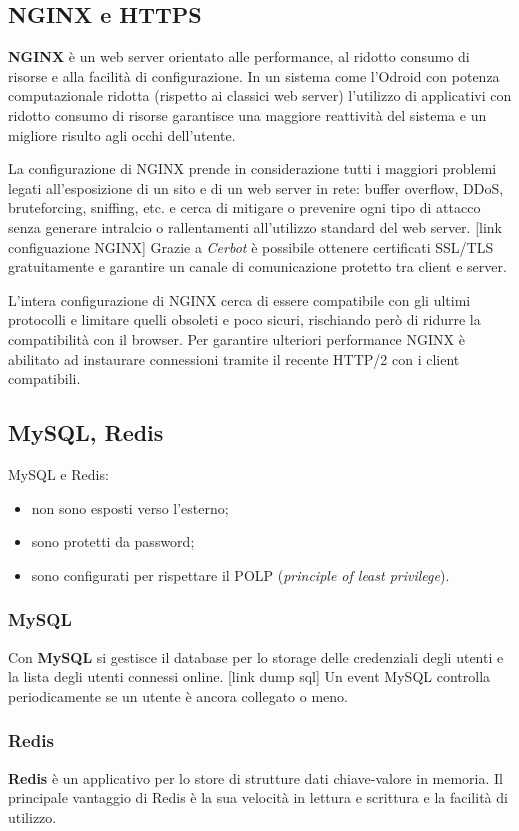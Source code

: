 \subsection{NGINX e HTTPS}
\textbf{NGINX} è un web server orientato alle performance, al ridotto consumo di risorse e alla facilità di configurazione.
In un sistema come l'Odroid con potenza computazionale ridotta (rispetto ai classici web server) l'utilizzo di applicativi con ridotto consumo di risorse garantisce una maggiore reattività del sistema e un migliore risulto agli occhi dell'utente.

La configurazione di NGINX prende in considerazione tutti i maggiori problemi legati all'esposizione di un sito e di un web server in rete: buffer overflow, DDoS, bruteforcing, sniffing, etc. e cerca di mitigare o prevenire ogni tipo di attacco senza generare intralcio o rallentamenti all'utilizzo standard del web server.
[link configuazione NGINX]
Grazie a \textit{Cerbot} è possibile ottenere certificati SSL/TLS gratuitamente e garantire un canale di comunicazione protetto tra client e server.

L'intera configurazione di NGINX cerca di essere compatibile con gli ultimi protocolli e limitare quelli obsoleti e poco sicuri, rischiando però di ridurre la compatibilità con il browser. Per garantire ulteriori performance NGINX è abilitato ad instaurare connessioni tramite il recente HTTP/2 con i client compatibili.

\subsection{MySQL, Redis}
MySQL e Redis:
\begin{itemize}
	\item non sono esposti verso l'esterno;
	\item sono protetti da password;
	\item sono configurati per rispettare il POLP (\textit{principle of least privilege}).
\end{itemize}
\subsubsection{MySQL}
Con \textbf{MySQL} si gestisce il database per lo storage delle credenziali degli utenti e la lista degli utenti connessi online.
[link dump sql]
Un event MySQL controlla periodicamente se un utente è ancora collegato o meno.

\subsubsection{Redis}
\textbf{Redis} è un applicativo per lo store di strutture dati chiave-valore in memoria. Il principale vantaggio di Redis è la sua velocità in lettura e scrittura e la facilità di utilizzo.

